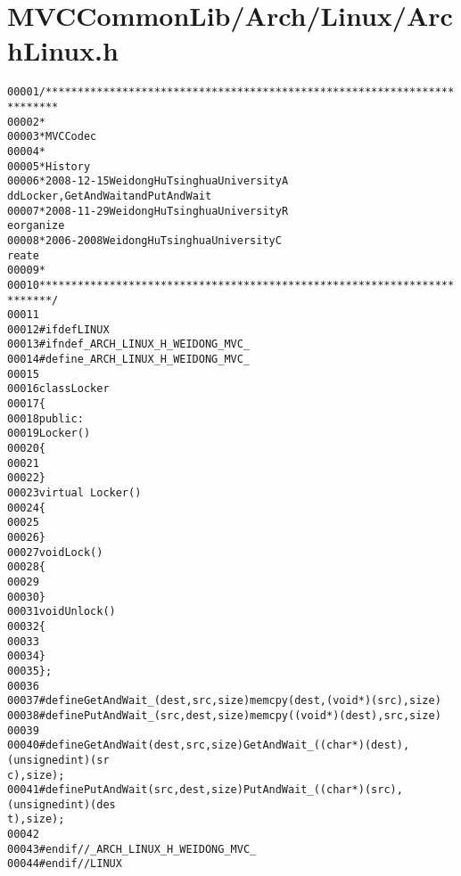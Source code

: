 \hypertarget{_arch_linux_8h_source}{
\section{MVCCommonLib/Arch/Linux/ArchLinux.h}
}


\begin{footnotesize}\begin{alltt}
00001 \textcolor{comment}{/************************************************************************}
00002 \textcolor{comment}{ *}
00003 \textcolor{comment}{ * MVC Codec}
00004 \textcolor{comment}{ * }
00005 \textcolor{comment}{ * History}
00006 \textcolor{comment}{ * 2008-12-15           Weidong Hu              Tsinghua University             A
      dd Locker, GetAndWait and PutAndWait}
00007 \textcolor{comment}{ * 2008-11-29           Weidong Hu              Tsinghua University             R
      eorganize}
00008 \textcolor{comment}{ * 2006-2008            Weidong Hu              Tsinghua University             C
      reate}
00009 \textcolor{comment}{ * }
00010 \textcolor{comment}{ ************************************************************************/}
00011 
00012 \textcolor{preprocessor}{#ifdef LINUX}
00013 \textcolor{preprocessor}{}\textcolor{preprocessor}{#ifndef \_ARCH\_LINUX\_H\_WEIDONG\_MVC\_}
00014 \textcolor{preprocessor}{}\textcolor{preprocessor}{#define \_ARCH\_LINUX\_H\_WEIDONG\_MVC\_}
00015 \textcolor{preprocessor}{}
00016 \textcolor{keyword}{class }Locker
00017 \{
00018 \textcolor{keyword}{public}:
00019         Locker()
00020         \{
00021 
00022         \}
00023         \textcolor{keyword}{virtual} ~Locker()
00024         \{
00025 
00026         \}
00027         \textcolor{keywordtype}{void} Lock()
00028         \{
00029 
00030         \}
00031         \textcolor{keywordtype}{void} Unlock()
00032         \{
00033 
00034         \}
00035 \};
00036 
00037 \textcolor{preprocessor}{#define GetAndWait\_(dest, src, size) memcpy(dest, (void*)(src), size)}
00038 \textcolor{preprocessor}{}\textcolor{preprocessor}{#define PutAndWait\_(src, dest, size) memcpy((void*)(dest), src, size)}
00039 \textcolor{preprocessor}{}
00040 \textcolor{preprocessor}{#define GetAndWait(dest, src, size) GetAndWait\_((char *)(dest), (unsigned int)(sr
      c), size);}
00041 \textcolor{preprocessor}{}\textcolor{preprocessor}{#define PutAndWait(src, dest, size) PutAndWait\_((char *)(src), (unsigned int)(des
      t), size);}
00042 \textcolor{preprocessor}{}
00043 \textcolor{preprocessor}{#endif //\_ARCH\_LINUX\_H\_WEIDONG\_MVC\_}
00044 \textcolor{preprocessor}{}\textcolor{preprocessor}{#endif //LINUX}
\end{alltt}\end{footnotesize}
